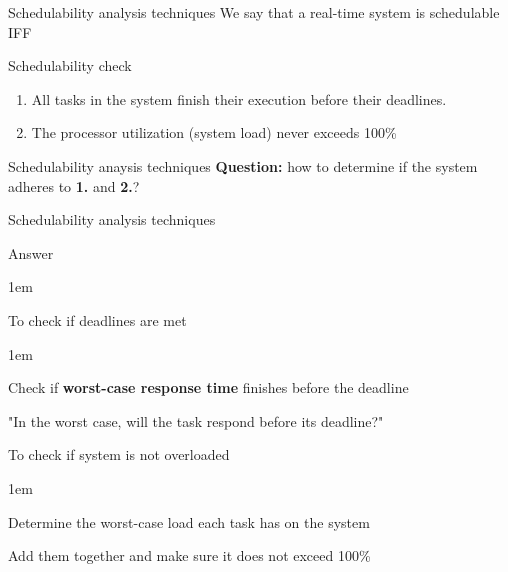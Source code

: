 \begin{frame}{Schedulability analysis techniques}
    We say that a real-time system is schedulable IFF
    \vspace{1em}
    \begin{block}{Schedulability check}
        \begin{enumerate}
            \item All tasks in the system finish their execution before their deadlines.
            \item The processor utilization (system load) never exceeds 100\%
        \end{enumerate}
    \end{block}
\end{frame}

\begin{frame}{Schedulability anaysis techniques}
    \textbf{Question:} how to determine if the system adheres to \textbf{1.} and \textbf{2.}?

\end{frame}

\begin{frame}{Schedulability analysis techniques}
    \begin{block}{Answer}
        \begin{itemize-size}{1em}
            \item To check if deadlines are met
            \begin{itemize-size}{1em}
                \vspace{0.5em}
                \item Check if \textbf{worst-case response time} finishes before the deadline
                \item "In the worst case, will the task respond before its deadline?"
            \end{itemize-size}
            \item To check if system is not overloaded
            \begin{itemize-size}{1em}
                \vspace{0.5em}
                \item Determine the worst-case load each task has on the system
                \item Add them together and make sure it does not exceed 100\%
            \end{itemize-size}
        \end{itemize-size} 
    \end{block}
\end{frame}

